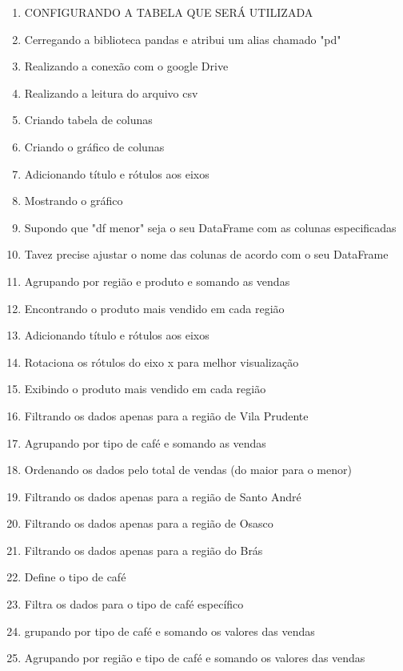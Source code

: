 		\begin{enumerate}
			\item CONFIGURANDO A TABELA QUE SERÁ UTILIZADA
			\item Cerregando a biblioteca pandas e atribui um alias chamado "pd"
                \item Realizando a conexão com o google Drive
                \item Realizando a leitura do arquivo csv
                \item Criando tabela de colunas
                \item Criando o gráfico de colunas
                \item Adicionando título e rótulos aos eixos
                \item Mostrando o gráfico
                \item Supondo que "df menor" seja o seu DataFrame com as colunas especificadas
                \item Tavez precise ajustar o nome das colunas de acordo com o seu DataFrame
                \item Agrupando por região e produto e somando as vendas
                \item Encontrando o produto mais vendido em cada região
                \item Adicionando título e rótulos aos eixos
                \item Rotaciona os rótulos do eixo x para melhor visualização
                \item Exibindo o produto mais vendido em cada região
                \item Filtrando os dados apenas para a região de Vila Prudente
                \item Agrupando por tipo de café e somando as vendas
                \item Ordenando os dados pelo total de vendas (do maior para o menor)
                \item Filtrando os dados apenas para a região de Santo André
                \item Filtrando os dados apenas para a região de Osasco
                \item Filtrando os dados apenas para a região do Brás
                \item Define o tipo de café
                \item Filtra os dados para o tipo de café específico
                \item grupando por tipo de café e somando os valores das vendas
                \item Agrupando por região e tipo de café e somando os valores das vendas
                
		\end{enumerate}

